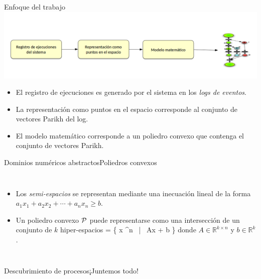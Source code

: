\documentclass[spanish,pdf]{beamer}
\begin{document}
\begin{frame}{Enfoque del trabajo}{}
  \centering
  \includegraphics[width=1.0\linewidth]{img/approach_simplificado.png}
  \begin{itemize}
    \setlength\itemsep{0.2cm}
    \item<1-> El registro de ejecuciones es generado por el sistema en los \textit{logs de eventos}.
    \item<1-> La representación como puntos en el espacio corresponde al conjunto de vectores Parikh del log.
    \item<2-> El modelo matemático corresponde a un poliedro convexo que contenga el conjunto de vectores Parikh.
  \end{itemize}
\end{frame}
\begin{frame}{Dominios numéricos abstractos}{Poliedros convexos}
  \begin{columns}


      \begin{itemize}
        \scriptsize
        \setlength\itemsep{0.2cm}
        \item<2-> Los \textit{semi-espacios} se representan mediante una inecuación lineal de la forma $a_1x_1 + a_2x_2 + \cdots + a_nx_n \geq b.$
        \item<3-> Un poliedro convexo ${\mathcal P}$ puede representarse como una intersección de un conjunto de $k$ hiper-espacios
            \bnnequation
                \ph = \{ x \in {}^n ~|~ A\cdot x + b \}
            \ennequation
            donde  \mbox{$A \in \mathbb{R}^{k \times n}$} y \mbox{$b\in\mathbb{R}^{k}$}.
      \end{itemize}

  \end{columns}
\end{frame}

\begin{frame}{Descubrimiento de procesos}{¡Juntemos todo!}
  \begin{columns}
        \centering
  \end{columns}
\end{frame}
\end{document}
